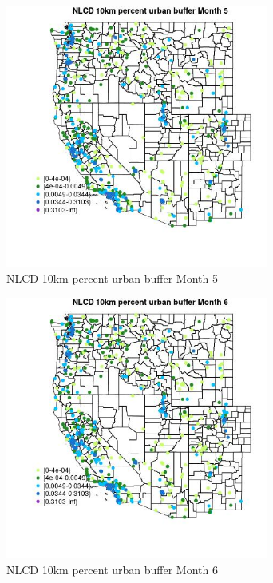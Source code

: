 \begin{figure} 
\centering  
\includegraphics[width=0.77\textwidth]{Code_Outputs/Report_ML_input_PM25_Step4_part_e_de_duplicated_aves_compiled_2019-05-14wNAs_MapObsMo5NLCD_10km_percent_urban_buffer.jpg} 
\caption{\label{fig:Report_ML_input_PM25_Step4_part_e_de_duplicated_aves_compiled_2019-05-14wNAsMapObsMo5NLCD_10km_percent_urban_buffer}NLCD 10km percent urban buffer Month 5} 
\end{figure} 
 

\begin{figure} 
\centering  
\includegraphics[width=0.77\textwidth]{Code_Outputs/Report_ML_input_PM25_Step4_part_e_de_duplicated_aves_compiled_2019-05-14wNAs_MapObsMo6NLCD_10km_percent_urban_buffer.jpg} 
\caption{\label{fig:Report_ML_input_PM25_Step4_part_e_de_duplicated_aves_compiled_2019-05-14wNAsMapObsMo6NLCD_10km_percent_urban_buffer}NLCD 10km percent urban buffer Month 6} 
\end{figure} 
 

